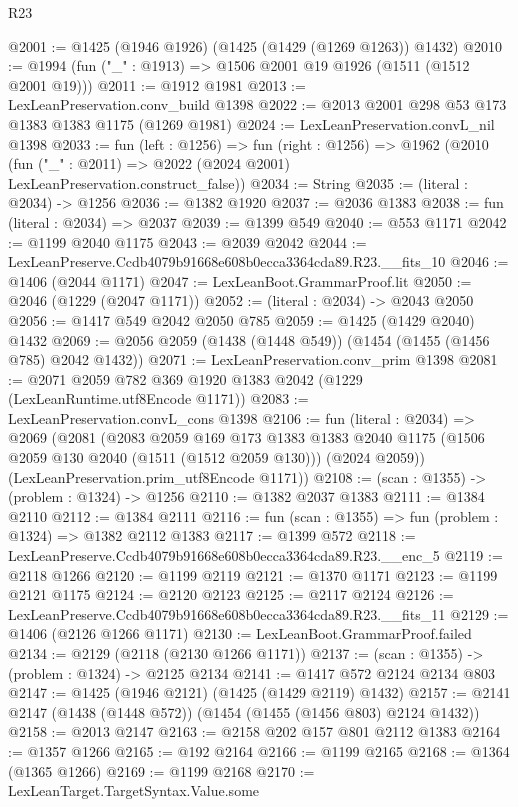 \begin{lexlean}{R23}
\begin{coremodule}
@2001 := @1425 (@1946 @1926) (@1425 (@1429 (@1269 @1263)) @1432)
@2010 := @1994 (fun ("_" : @1913) => @1506 @2001 @19 @1926 (@1511 (@1512 @2001 @19)))
@2011 := @1912 @1981
@2013 := LexLeanPreservation.conv_build @1398
@2022 := @2013 @2001 @298 @53 @173 @1383 @1383 @1175 (@1269 @1981)
@2024 := LexLeanPreservation.convL_nil @1398
@2033 := fun (left : @1256) =>
  fun (right : @1256) =>
  @1962 (@2010 (fun ("_" : @2011) => @2022 (@2024 @2001) LexLeanPreservation.construct_false))
@2034 := String
@2035 := (literal : @2034) -> @1256
@2036 := @1382 @1920
@2037 := @2036 @1383
@2038 := fun (literal : @2034) => @2037
@2039 := @1399 @549
@2040 := @553 @1171
@2042 := @1199 @2040 @1175
@2043 := @2039 @2042
@2044 := LexLeanPreserve.Ccdb4079b91668e608b0ecca3364cda89.R23.__fits_10
@2046 := @1406 (@2044 @1171)
@2047 := LexLeanBoot.GrammarProof.lit
@2050 := @2046 (@1229 (@2047 @1171))
@2052 := (literal : @2034) -> @2043 @2050
@2056 := @1417 @549 @2042 @2050 @785
@2059 := @1425 (@1429 @2040) @1432
@2069 := @2056 @2059 (@1438 (@1448 @549)) (@1454 (@1455 (@1456 @785) @2042 @1432))
@2071 := LexLeanPreservation.conv_prim @1398
@2081 := @2071 @2059 @782 @369 @1920 @1383 @2042 (@1229 (LexLeanRuntime.utf8Encode @1171))
@2083 := LexLeanPreservation.convL_cons @1398
@2106 := fun (literal : @2034) =>
  @2069
    (@2081
      (@2083
        @2059
        @169
        @173
        @1383
        @1383
        @2040
        @1175
        (@1506 @2059 @130 @2040 (@1511 (@1512 @2059 @130)))
        (@2024 @2059))
      (LexLeanPreservation.prim_utf8Encode @1171))
@2108 := (scan : @1355) -> (problem : @1324) -> @1256
@2110 := @1382 @2037 @1383
@2111 := @1384 @2110
@2112 := @1384 @2111
@2116 := fun (scan : @1355) => fun (problem : @1324) => @1382 @2112 @1383
@2117 := @1399 @572
@2118 := LexLeanPreserve.Ccdb4079b91668e608b0ecca3364cda89.R23.__enc_5
@2119 := @2118 @1266
@2120 := @1199 @2119
@2121 := @1370 @1171
@2123 := @1199 @2121 @1175
@2124 := @2120 @2123
@2125 := @2117 @2124
@2126 := LexLeanPreserve.Ccdb4079b91668e608b0ecca3364cda89.R23.__fits_11
@2129 := @1406 (@2126 @1266 @1171)
@2130 := LexLeanBoot.GrammarProof.failed
@2134 := @2129 (@2118 (@2130 @1266 @1171))
@2137 := (scan : @1355) -> (problem : @1324) -> @2125 @2134
@2141 := @1417 @572 @2124 @2134 @803
@2147 := @1425 (@1946 @2121) (@1425 (@1429 @2119) @1432)
@2157 := @2141 @2147 (@1438 (@1448 @572)) (@1454 (@1455 (@1456 @803) @2124 @1432))
@2158 := @2013 @2147
@2163 := @2158 @202 @157 @801 @2112 @1383
@2164 := @1357 @1266
@2165 := @192 @2164
@2166 := @1199 @2165
@2168 := @1364 (@1365 @1266)
@2169 := @1199 @2168
@2170 := LexLeanTarget.TargetSyntax.Value.some

\end{coremodule}
\end{lexlean}
